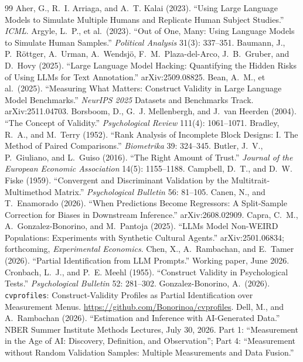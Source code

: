 \documentclass[10pt,letterpaper]{article}
\begin{document}
\begin{thebibliography}{99}\small
{} Aher, G., R.~I. Arriaga, and A.~T. Kalai (2023). ``Using Large Language Models to Simulate Multiple Humans and Replicate Human Subject Studies.'' \textit{ICML}.
 Argyle, L.~P., et al.\ (2023). ``Out of One, Many: Using Language Models to Simulate Human Samples.'' \textit{Political Analysis} 31(3): 337--351.
 Baumann, J., P.~R\"ottger, A.~Urman, A.~Wendsj\"o, F.~M.~Plaza-del-Arco, J.~B.~Gruber, and D.~Hovy (2025). ``Large Language Model Hacking: Quantifying the Hidden Risks of Using LLMs for Text Annotation.'' arXiv:2509.08825.
 Bean, A.~M., et al.\ (2025). ``Measuring What Matters: Construct Validity in Large Language Model Benchmarks.'' \textit{NeurIPS 2025} Datasets and Benchmarks Track. arXiv:2511.04703.
 Borsboom, D., G.~J. Mellenbergh, and J.\ van Heerden (2004). ``The Concept of Validity.'' \textit{Psychological Review} 111(4): 1061--1071.
 Bradley, R.~A., and M.~Terry (1952). ``Rank Analysis of Incomplete Block Designs: I. The Method of Paired Comparisons.'' \textit{Biometrika} 39: 324--345.
 Butler, J.~V., P.~Giuliano, and L.~Guiso (2016). ``The Right Amount of Trust.'' \textit{Journal of the European Economic Association} 14(5): 1155--1188.
 Campbell, D.~T., and D.~W. Fiske (1959). ``Convergent and Discriminant Validation by the Multitrait-Multimethod Matrix.'' \textit{Psychological Bulletin} 56: 81--105.
 Canen, N., and T.~Enamorado (2026). ``When Predictions Become Regressors: A Split-Sample Correction for Biases in Downstream Inference.'' arXiv:2608.02909.
 Capra, C.~M., A.~Gonzalez-Bonorino, and M.~Pantoja (2025). ``LLMs Model Non-WEIRD Populations: Experiments with Synthetic Cultural Agents.'' arXiv:2501.06834; forthcoming, \textit{Experimental Economics}.
 Chen, X., A.~Rambachan, and E.~Tamer (2026). ``Partial Identification from LLM Prompts.'' Working paper, June 2026.
 Cronbach, L.~J., and P.~E. Meehl (1955). ``Construct Validity in Psychological Tests.'' \textit{Psychological Bulletin} 52: 281--302.
 Gonzalez-Bonorino, A.\ (2026). \texttt{cvprofiles}: Construct-Validity Profiles as Partial Identification over Measurement Menus. \url{https://github.com/Bonorinoa/cvprofiles}.
 Dell, M., and A.~Rambachan (2026). ``Estimation and Inference with AI-Generated Data.'' NBER Summer Institute Methods Lectures, July 30, 2026. Part 1: ``Measurement in the Age of AI: Discovery, Definition, and Observation''; Part 4: ``Measurement without Random Validation Samples: Multiple Measurements and Data Fusion.''

\end{thebibliography}
\end{document}
